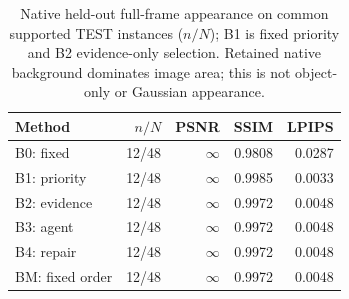 \begin{table}[t]
\centering\small
\caption{Native held-out full-frame appearance on common supported TEST instances ($n/N$); B1 is fixed priority and B2 evidence-only selection. Retained native background dominates image area; this is not object-only or Gaussian appearance.}
\label{tab:native-test-appearance}
\begin{tabular}{lrrrr}
\toprule
Method & $n/N$ & PSNR & SSIM & LPIPS \\
\midrule
B0: fixed & 12/48 & $\infty$ & 0.9808 & 0.0287 \\
B1: priority & 12/48 & $\infty$ & 0.9985 & 0.0033 \\
B2: evidence & 12/48 & $\infty$ & 0.9972 & 0.0048 \\
B3: agent & 12/48 & $\infty$ & 0.9972 & 0.0048 \\
B4: repair & 12/48 & $\infty$ & 0.9972 & 0.0048 \\
BM: fixed order & 12/48 & $\infty$ & 0.9972 & 0.0048 \\
\bottomrule
\end{tabular}
\end{table}
